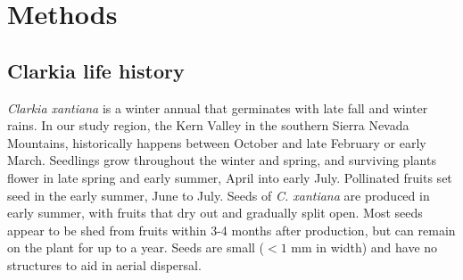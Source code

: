 \documentclass[12pt, oneside, titlepage]{article}   	%
\begin{document}
\singlespace
\begin{center}
 \label{tab:title} 
\end{center}
\doublespace
\section{Methods}

\subsection{Clarkia life history}

\textit{Clarkia xantiana} is a winter annual that germinates with late fall and winter rains. In our study region, the Kern Valley in the southern Sierra Nevada Mountains, historically happens between October and late February or early March. Seedlings grow throughout the winter and spring, and surviving plants flower in late spring and early summer, April into early July. Pollinated fruits set seed in the early summer, June to July. Seeds of \textit{C. xantiana} are produced in early summer, with fruits that dry out and gradually split open. Most seeds appear to be shed from fruits within 3-4 months after production, but can remain on the plant for up to a year. Seeds are small ($<1$ mm in width) and have no structures to aid in aerial dispersal. 
\end{document}
